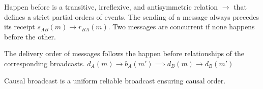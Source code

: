

\begin{definition}
  Happen before is a transitive, irreflexive, and antisymmetric relation
  $\rightarrow$ that defines a strict partial orders of events. The sending of a
  message always precedes its receipt $s_{AB}(m) \rightarrow r_{BA}(m)$. Two
  messages are concurrent if none happens before the other.
\end{definition}

\begin{definition}
  The delivery order of messages follows the happen before relationships of the
  corresponding broadcasts.
  $d_A(m) \rightarrow b_A(m') \implies d_B(m) \rightarrow d_B(m')$
\end{definition}

\begin{definition}
  Causal broadcast is a uniform reliable broadcast ensuring causal order.
\end{definition}



%     


